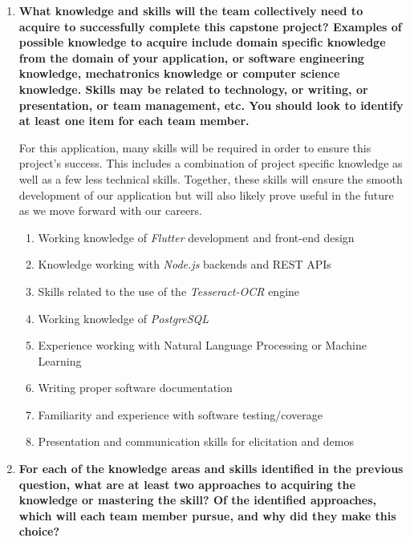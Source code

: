 \documentclass[12pt]{article}
\begin{document}
\begin{enumerate}
  \item \textbf{What knowledge and skills will the team collectively need to acquire to
  successfully complete this capstone project?  Examples of possible knowledge
  to acquire include domain specific knowledge from the domain of your
  application, or software engineering knowledge, mechatronics knowledge or
  computer science knowledge.  Skills may be related to technology, or writing,
  or presentation, or team management, etc.  You should look to identify at
  least one item for each team member.}

  For this application, many skills will be required in order to ensure this
  project's success. This includes a combination of project specific knowledge
  as well as a few less technical skills. Together, these skills will ensure the
  smooth development of our application but will also likely prove useful in the future
  as we move forward with our careers.
  \begin{enumerate}
    \item Working knowledge of \textit{Flutter} development and front-end design
    \item Knowledge working with \textit{Node.js} backends and REST APIs
    \item Skills related to the use of the \textit{Tesseract-OCR} engine
    \item Working knowledge of \textit{PostgreSQL}
    \item Experience working with Natural Language Processing or Machine Learning
    \item Writing proper software documentation
    \item Familiarity and experience with software testing/coverage
    \item Presentation and communication skills for elicitation and demos
  \end{enumerate}  

  \item \textbf{For each of the knowledge areas and skills identified in the previous
  question, what are at least two approaches to acquiring the knowledge or
  mastering the skill?  Of the identified approaches, which will each team
  member pursue, and why did they make this choice?}


\end{enumerate}
\end{document}
